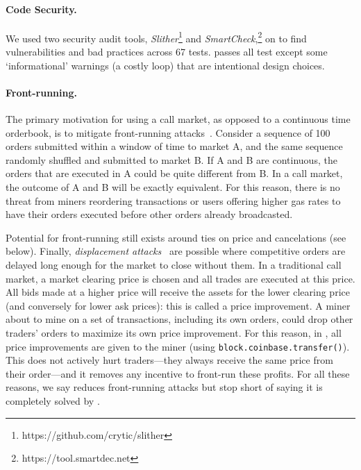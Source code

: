 \paragraph{Code Security.} We used two security audit tools, \textit{Slither}\footnote{https://github.com/crytic/slither} and \textit{SmartCheck},\footnote{https://tool.smartdec.net} on \cm to find vulnerabilities and bad practices across 67 tests. \cm passes all test except some `informational' warnings (\eg a costly loop) that are intentional design choices.

\paragraph{Front-running.} The primary motivation for using a call market, as opposed to a continuous time orderbook, is to mitigate front-running attacks~\cite{clark2014decentralizing,eskandari2019sok,daian2019flash}. Consider a sequence of 100 orders submitted within a window of time to market A, and the same sequence randomly shuffled and submitted to market B. If A and B are continuous, the orders that are executed in A could be quite different from B. In a call market, the outcome of A and B will be exactly equivalent. For this reason, there is no threat from miners reordering transactions or users offering higher gas rates to have their orders executed before other orders already broadcasted. 

Potential for front-running still exists around ties on price and cancelations (see below). Finally, \textit{displacement attacks}~\cite{eskandari2019sok} are possible where competitive orders are delayed long enough for the market to close without them. In a traditional call market, a market clearing price is chosen and all trades are executed at this price. All bids made at a higher price will receive the assets for the lower clearing price (and conversely for lower ask prices): this is called a price improvement. A miner about to mine on a set of transactions, including its own orders, could drop other traders' orders to maximize its own price improvement. For this reason, in \cm, all price improvements are given to the miner (using \texttt{block.coinbase.transfer()}). This does not actively hurt traders---they always receive the same price from their order---and it removes any incentive to front-run these profits. For all these reasons, we say \cm reduces front-running attacks but stop short of saying it is completely solved by \cm. 



